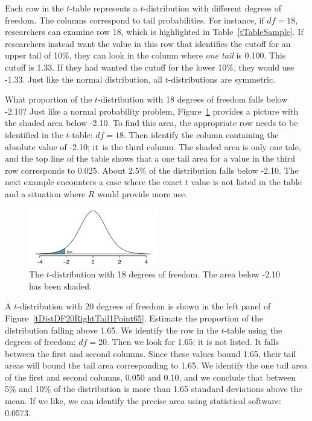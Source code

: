 Each row in the $t$-table represents a $t$-distribution with different degrees of freedom. The columns correspond to tail probabilities. For instance, if $df=18$, researchers can examine row 18, which is highlighted in Table~\ref{tTableSample}. If researchers instead want the value in this row that identifies the cutoff for an upper tail of 10\%, they can look in the column where \emph{one tail} is 0.100. This cutoff is 1.33. If they had wanted the cutoff for the lower 10\%, they would use -1.33. Just like the normal distribution, all $t$-distributions are symmetric.

\begin{example}{What proportion of the $t$-distribution with 18 degrees of freedom falls below -2.10?}
Just like a normal probability problem, Figure~\ref{tDistDF18LeftTail2Point10} provides a picture with the shaded area below -2.10. To find this area, the appropriate row needs to be identified in the $t$-table: \mbox{$df=18$}. 
Then identify the column containing the absolute value of -2.10; it~is the third column. The shaded area is only one tale, and the top line of the table shows that a one tail area for a value in the third row corresponds to 0.025. About 2.5\% of the distribution falls below -2.10. The next example encounters a case where the exact $t$ value is not listed in the table and a situation where $R$ would provide more use.
\end{example}

\begin{figure}
\centering
\includegraphics[width=0.5\textwidth]{ch_inference_foundations_oi_biostat/figures/tDistDF18LeftTail2Point10/tDistDF18LeftTail2Point10}
\caption{The $t$-distribution with 18 degrees of freedom. The area below -2.10 has been shaded.}
\label{tDistDF18LeftTail2Point10}
\end{figure}










\begin{example}{A $t$-distribution with 20 degrees of freedom is shown in the left panel of Figure~\ref{tDistDF20RightTail1Point65}. Estimate the proportion of the distribution falling above 1.65.}
We identify the row in the $t$-table using the degrees of freedom: $df=20$. Then we look for 1.65; it is not listed. It falls between the first and second columns. Since these values bound 1.65, their tail areas will bound the tail area corresponding to 1.65. We identify the one tail area of the first and second columns, 0.050 and 0.10, and we conclude that between 5\% and 10\% of the distribution is more than 1.65 standard deviations above the mean. If we like, we can identify the precise area using statistical software: 0.0573.
\end{example}

